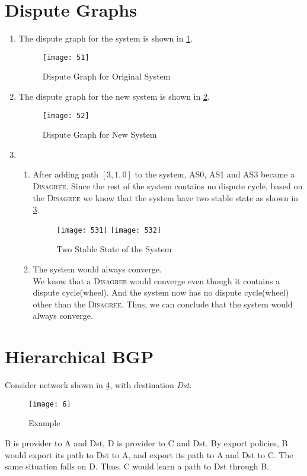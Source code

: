 \documentclass[12pt,titlepage,letterpaper]{article}
\begin{document}
\section{Dispute Graphs}
\begin{enumerate}[label=\bfseries\alph*)]
    \item The dispute graph for the system is shown in \cref{51}.
        \begin{figure}[H]
            \centering
            \caption{Dispute Graph for Original System}\label{51}
            \texttt{[image: 51]}
        \end{figure}
    \item The dispute graph for the new system is shown in \cref{52}.
        \begin{figure}[H]
            \centering
            \caption{Dispute Graph for New System}\label{52}
            \texttt{[image: 52]}
        \end{figure}
    \item
        \begin{enumerate}[label=\roman*. ]
            \item After adding path $[3,1,0]$ to the system, AS0, AS1 and AS3
                became a \textsc{Disagree}.
                Since the rest of the system contains no dispute cycle,
                based on the \textsc{Disagree} we know that
                the system have two stable state as shown in \cref{53}.
                \begin{figure}[H]
                    \centering
                    \caption{Two Stable State of the System}\label{53}
                    \texttt{[image: 531]}
                    \hfill
                    \texttt{[image: 532]}
                \end{figure}
            \item The system would always converge.\\
                We know that a \textsc{Disagree} would converge even though it
                contains a dispute cycle(wheel). And the system now has no
                dispute cycle(wheel) other than the \textsc{Disagree}.
                Thus, we can conclude that the system would always converge.
        \end{enumerate}
\end{enumerate}

\section{Hierarchical BGP}
Consider network shown in \cref{6}, with destination \emph{Dst}.
\begin{figure}[H]
    \centering
    \caption{Example}\label{6}
    \texttt{[image: 6]}
\end{figure}
B is provider to A and Dst, D is provider to C and Dst.
By export policies, B would export its path to Dst to A, and export its path to
A and Dst to C. The same situation falls on D.
Thus, C would learn a path to Dst through B.
\end{document}
